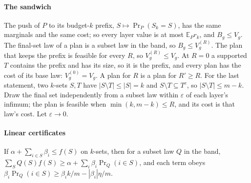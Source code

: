 \paragraph{The sandwich} The push of $P$ to its budget-$k$ prefix, $S\mapsto\Pr_P(S_k=S)$, has the
same marginals and the same cost; so every layer value is at most $\mathbb E_Pr_k$, and
$B_g\le V_g$. The final-set law of a plan is a subset law in the band, so $B_g\le V^{(R)}_g$. The
plan that keeps the prefix is feasible for every $R$, so $V^{(R)}_g\le V_g$. At $R=0$ a
supported $T$ contains the prefix and has its size, so it is the prefix, and every plan has the
cost of its base law: $V^{(0)}_g=V_g$. A plan for $R$ is a plan for $R'\ge R$. For the last
statement, two $k$-sets $S,T$ have $|S\setminus T|\le|S|=k$ and $S\setminus T\subseteq T^{c}$,
so $|S\setminus T|\le m-k$. Draw the final set independently from a subset law within
$\varepsilon$ of each layer's infimum; the plan is feasible when $\min(k,m-k)\le R$, and its
cost is that law's cost. Let $\varepsilon\to0$.

\paragraph{Linear certificates} If $\alpha+\sum_{i\in S}\beta_i\le f(S)$ on $k$-sets, then for a
subset law $Q$ in the band,
$\sum_SQ(S)f(S)\ge\alpha+\sum_i\beta_i\Pr_Q(i\in S)$, and each term obeys
$\beta_i\Pr_Q(i\in S)\ge\beta_ik/m-|\beta_i|\eta/m$.

